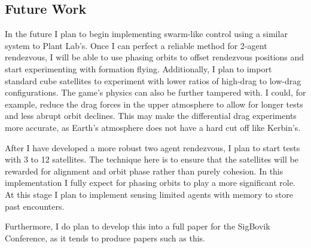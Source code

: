 \documentclass[journal,a4paper,12pt]{IEEEtran}
\begin{document}
\subsection{Future Work}
In the future I plan to begin implementing swarm-like control using a similar
system to Plant Lab's. Once I can perfect a reliable method for 2-agent rendezvous,
I will be able to use phasing orbits to offset rendezvous positions and start
experimenting with formation flying. Additionally, I plan to import standard
cube satellites to experiment with lower ratios of high-drag to low-drag
configurations. The game's physics can also be further tampered with. I could, for
example, reduce the drag forces in the upper atmosphere to allow for longer tests
and less abrupt orbit declines. This may make the differential drag experiments
more accurate, as Earth's atmosphere does not have a hard cut off like Kerbin's.

After I have developed a more robust two agent rendezvous, I plan to start tests
with 3 to 12 satellites. The technique here is to ensure that the satellites will
be rewarded for alignment and orbit phase rather than purely cohesion. In this
implementation I fully expect for phasing orbits to play a more significant role.
At this stage I plan to implement sensing limited agents with memory to store
past encounters.


Furthermore, I do plan to develop this into a full paper for the SigBovik Conference,
as it tends to produce papers such as this.

%
%
%


{}



%



\end{document}
